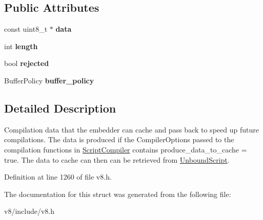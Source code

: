 \subsection*{Public Attributes}
\begin{DoxyCompactItemize}
\item 
\mbox{\label{structv8_1_1ScriptCompiler_1_1CachedData_a31e313a969170116f98d5a76c110fe61}} 
const uint8\+\_\+t $\ast$ {\bfseries data}
\item 
\mbox{\label{structv8_1_1ScriptCompiler_1_1CachedData_ad7b8b1b672095a2c33621d3d5b5c7f8f}} 
int {\bfseries length}
\item 
\mbox{\label{structv8_1_1ScriptCompiler_1_1CachedData_aa1d16fbd48957df19d4cc1c886afff8f}} 
bool {\bfseries rejected}
\item 
\mbox{\label{structv8_1_1ScriptCompiler_1_1CachedData_a1e5c9ff625ac790139aec4294493fe32}} 
Buffer\+Policy {\bfseries buffer\+\_\+policy}
\end{DoxyCompactItemize}


\subsection{Detailed Description}
Compilation data that the embedder can cache and pass back to speed up future compilations. The data is produced if the Compiler\+Options passed to the compilation functions in \mbox{\hyperlink{classv8_1_1ScriptCompiler}{Script\+Compiler}} contains produce\+\_\+data\+\_\+to\+\_\+cache = true. The data to cache can then can be retrieved from \mbox{\hyperlink{classv8_1_1UnboundScript}{Unbound\+Script}}. 

Definition at line 1260 of file v8.\+h.



The documentation for this struct was generated from the following file\+:\begin{DoxyCompactItemize}
\item 
v8/include/v8.\+h\end{DoxyCompactItemize}
